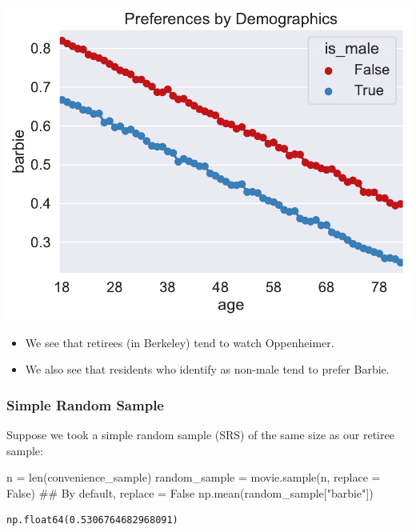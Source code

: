 \documentclass[
  letterpaper,
  DIV=11,
  numbers=noendperiod]{scrreprt}
\newenvironment{Shaded}{\begin{snugshade}}{\end{snugshade}}
\newcommand{\BuiltInTok}[1]{\textcolor[rgb]{0.00,0.23,0.31}{#1}}
\newcommand{\CommentTok}[1]{\textcolor[rgb]{0.37,0.37,0.37}{#1}}
\newcommand{\NormalTok}[1]{\textcolor[rgb]{0.00,0.23,0.31}{#1}}
\newcommand{\OperatorTok}[1]{\textcolor[rgb]{0.37,0.37,0.37}{#1}}
\newcommand{\StringTok}[1]{\textcolor[rgb]{0.13,0.47,0.30}{#1}}
\newcommand{\VariableTok}[1]{\textcolor[rgb]{0.07,0.07,0.07}{#1}}
\providecommand{\tightlist}{%
  \setlength{\itemsep}{0pt}\setlength{\parskip}{0pt}}\usepackage{longtable,booktabs,array}
\begin{document}
\includegraphics{sampling/sampling_files/figure-pdf/cell-9-output-1.pdf}

\begin{itemize}
\tightlist
\item
  We see that retirees (in Berkeley) tend to watch Oppenheimer.
\item
  We also see that residents who identify as non-male tend to prefer
  Barbie.
\end{itemize}

\subsubsection{Simple Random Sample}\label{simple-random-sample}

Suppose we took a simple random sample (SRS) of the same size as our
retiree sample:

\begin{Shaded}
\begin{Highlighting}[]
\NormalTok{n }\OperatorTok{=} \BuiltInTok{len}\NormalTok{(convenience\_sample)}
\NormalTok{random\_sample }\OperatorTok{=}\NormalTok{ movie.sample(n, replace }\OperatorTok{=} \VariableTok{False}\NormalTok{) }\CommentTok{\#\# By default, replace = False}
\NormalTok{np.mean(random\_sample[}\StringTok{"barbie"}\NormalTok{])}
\end{Highlighting}
\end{Shaded}

\begin{verbatim}
np.float64(0.5306764682968091)
\end{verbatim}
\end{document}
